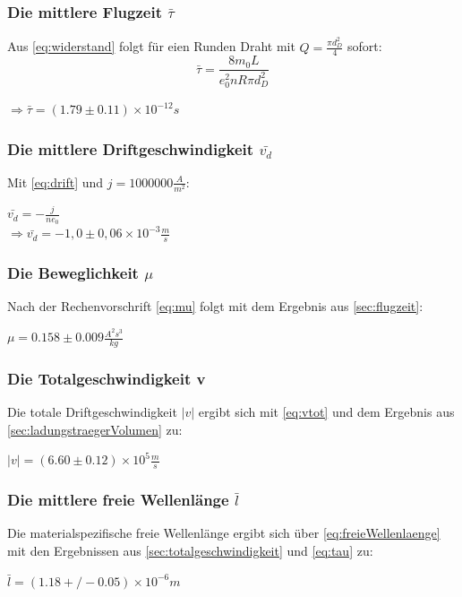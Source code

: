 \subsubsection{Die mittlere Flugzeit $\bar{\tau}$}
\label{sec:flugzeit}
Aus \autoref{eq:widerstand} folgt für eien Runden Draht mit $Q=\frac{\pi d_D^2}{4}$ sofort:
\begin{equation}
    \label{eq:tau}
    \bar{\tau}=\frac{8m_0L}{e_0^2n R \pi d_{D}^2}
\end{equation}
\begin{center}
    $\Rightarrow \bar{\tau}=(1.79\pm0.11) \times10^{-12} s$
\end{center}

\subsubsection{Die mittlere Driftgeschwindigkeit $\bar{v_d}$}
\label{sec:driftgeschwindigkeit}
Mit \autoref{eq:drift} und $j=1000000\frac{A}{m^2}$:
\begin{center}
    $\bar{v_d}=-\frac{j}{ne_0}$\\
    $\Rightarrow \bar{v_d}=-1,0 \pm 0,06 \times 10^{-3} \frac{m}{s}$
\end{center}
\subsubsection{Die Beweglichkeit $\mu$}
\label{sec:beweglichkeit}
Nach der Rechenvorschrift \autoref{eq:mu} folgt mit dem Ergebnis aus \autoref{sec:flugzeit}:
\begin{center}
    $\mu=0.158\pm0.009 \frac{A^2s^3}{kg} $
\end{center}
\subsubsection{Die Totalgeschwindigkeit v}
\label{sec:totalgeschwindigkeit}
Die totale Driftgeschwindigkeit $\vert v \vert$ ergibt sich mit \autoref{eq:vtot} und dem Ergebnis aus 
\autoref{sec:ladungstraegerVolumen} zu:
\begin{center}
    $\vert v \vert=(6.60\pm0.12)\times10^5 \frac{m}{s}$
\end{center}

\subsubsection{Die mittlere freie Wellenlänge $\bar{l}$}
\label{sec:wellenlaenge}
Die materialspezifische freie Wellenlänge ergibt sich über \autoref{eq:freieWellenlaenge} mit den Ergebnissen 
aus \autoref{sec:totalgeschwindigkeit} und \autoref{eq:tau} zu:
\begin{center}
    $\bar{l}=(1.18+/-0.05)\times 10^{-6} m$
\end{center}
